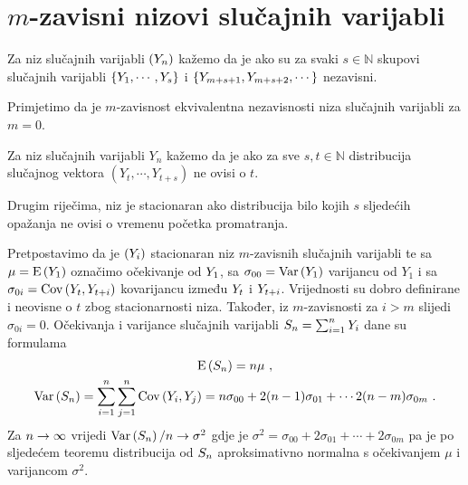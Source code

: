 \section{$m$-zavisni nizovi slučajnih varijabli}

\begin{defn}
	Za niz slučajnih varijabli $(\tsvar{Y}_n)$ kažemo da je 
	ako su za svaki $s \in \mathbb{N}$
	skupovi slučajnih varijabli 
	$\{\tsvar{Y}_1,\cdots,\tsvar{Y}_s\}$
	i $\{\tsvar{Y}_{m+s+1},\tsvar{Y}_{m+s+2},\cdots\}$ nezavisni.
\end{defn}

Primjetimo da je $m$-zavisnost ekvivalentna nezavisnosti
niza slučajnih varijabli za $m=0$.

\begin{defn}
	Za niz slučajnih varijabli $Y_n$ kažemo da je 
	ako za sve $s,t \in \mathbb{N}$
	distribucija slučajnog vektora $(Y_t,\cdots,Y_{t+s})$
	ne ovisi o $t$.
\end{defn}

Drugim riječima, niz je stacionaran ako distribucija
bilo kojih $s$ sljedećih opažanja ne ovisi o vremenu
početka promatranja.

Pretpostavimo da je $(\tsvar{Y}_i)$ stacionaran
niz $m$-zavisnih 
slučajnih varijabli te sa $\mu = \vE{\tsvar{Y}_1}$ označimo očekivanje od $\tsvar{Y}_1$,
sa $\sigma_{00}  = \vVar{\tsvar{Y}_1}$ varijancu od $Y_1$ i
sa $\sigma_{0i}  = \vCov{\tsvar{Y}_t, \tsvar{Y}_{t+i}}$ kovarijancu
između $\tsvar{Y}_t$ i $\tsvar{Y}_{t+i}$. Vrijednosti su dobro
definirane i neovisne o $t$ zbog stacionarnosti niza.
Također, iz $m$-zavisnosti za $i>m$ slijedi $\sigma_{0i}=0$.
Očekivanja i varijance slučajnih varijabli
$\tsvar{S}_n = \sum_{i=1}^{n} \tsvar{Y}_i$ dane su formulama
%
\begin{gather*}
	\vE{\tsvar{S}_n} = n \mu \ ,\\
	\vVar{\tsvar{S}_n} = \sum_{i=1}^{n} \sum_{j=1}^{n} \vCov{\tsvar{Y}_i,\tsvar{Y}_j} =
	n \sigma_{00} + 2(n-1)\sigma_{01} + \cdots
	2(n-m)\sigma_{0m} \ .
\end{gather*}
%
Za $n \rightarrow \infty$ vrijedi $\konv{\vVar{\tsvar{S}_n}/n}{\sigma^2}$ gdje
je $\sigma^2 = \sigma_{00} + 2\sigma_{01} + \cdots + 2\sigma_{0m}$
pa je po sljedećem teoremu distribucija od $\tsvar{S}_n$ aproksimativno normalna
s očekivanjem $\mu$ i varijancom $\sigma^2$.

